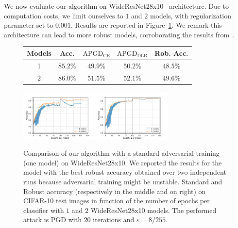 We now evaluate our algorithm on WideResNet28x10~\cite{ZagoruykoK16} architecture. Due to computation costs, we limit ourselves to $1$ and $2$ models, with regularization parameter set to $0.001$. Results are reported in Figure~\ref{fig:xp-wideresnet}. We remark this architecture can lead to more robust models, corroborating the results from~\cite{gowal2020uncovering}.
\begin{figure}[!ht]
\begin{center}

\begin{small}
\begin{tabular}{c|c|ccc} 
\textbf{ Models} & \textbf{Acc. }&\textbf{$\textrm{APGD}_\textrm{CE}$}& \textbf{$\textrm{APGD}_\textrm{DLR}$} & \textbf{Rob. Acc.} \\ \hline
 1 & $85.2\%$ &	$49.9\%$ & $50.2\%$ & $48.5\%$ \\ 
 2 & $\bm{86.0\%}$ & $\bm{51.5\%}$ & $\bm{52.1\%}$ & $\bm{49.6\%}$\\ 

\end{tabular}
\end{small}

\includegraphics[width=0.35\textwidth]{Images/robust_acc_finalrun_WideResNet28x10_1024_200_0.001.pdf}\includegraphics[width=0.35\textwidth]{Images/standard_acc_finalrun_WideResNet28x10_1024_200_0.001.pdf} 
  
\caption{Comparison of our algorithm with a standard adversarial training (one model) on WideResNet28x10. We reported the results for the model with the best robust accuracy obtained over two independent runs because adversarial training might be unstable. Standard and Robust accuracy (respectively in the middle and on right) on CIFAR-10 test images in function of the number of epochs per classifier with $1$ and $2$ WideResNet28x10 models. The performed attack is PGD with $20$ iterations and $\varepsilon=8/255$.}
\label{fig:xp-wideresnet}
\end{center}
\end{figure}


